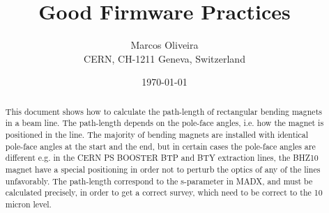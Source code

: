 \documentclass{cernatsnote}
\title{Good Firmware Practices}
\author{
	Marcos Oliveira \; \\		
	CERN, CH-1211 Geneva, Switzerland
}
\date{\today}
\begin{document}
\maketitle

\begin{abstract}
This document shows how to calculate the path-length of rectangular bending magnets in a beam line. The path-length depends on the pole-face angles, i.e. how the magnet is positioned in the line. The majority of bending magnets are installed with identical pole-face angles at the start and the end, but in certain cases the pole-face angles are different e.g. in the CERN PS BOOSTER BTP and BTY extraction lines, the BHZ10 magnet have a special positioning in order not to perturb the optics of any of the lines unfavorably.
 The path-length correspond to the s-parameter in MADX, and must be calculated precisely, in order to get a correct survey, which need to be correct to the 10 micron level.
\end{abstract}
\\ \\ \\ 

\begingroup
\color{black}
\tableofcontents
\endgroup

\pagebreak





\end{document}
